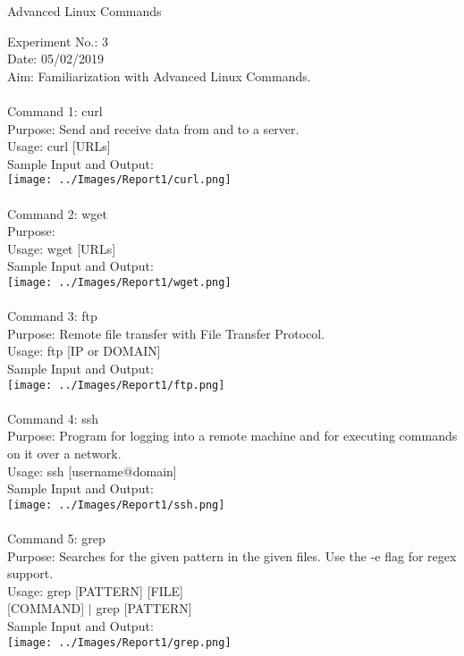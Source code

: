 \documentclass[10pt,a4paper]{report}
\begin{document}
\begin{center}
\begin{Large}
Advanced Linux Commands
\end{Large}
\end{center}
Experiment No.: 3\\
Date: 05/02/2019\\
Aim: Familiarization with Advanced Linux Commands.\\
\\
Command 1: curl\\
Purpose: Send and receive data from and to a server.\\
Usage: curl [URLs]\\
Sample Input and Output: \\
\texttt{[image: ../Images/Report1/curl.png]}\\
\\
Command 2: wget\\
Purpose: \\
Usage: wget [URLs]\\
Sample Input and Output: \\
\texttt{[image: ../Images/Report1/wget.png]}\\
\\
Command 3: ftp\\
Purpose: Remote file transfer with File Transfer Protocol.\\
Usage: ftp [IP or DOMAIN]\\
Sample Input and Output: \\
\texttt{[image: ../Images/Report1/ftp.png]}\\
\pagebreak
\\
Command 4: ssh\\
Purpose: Program for logging into a remote machine and for executing commands on it over a network.\\
Usage: ssh [username@domain]\\
Sample Input and Output: \\
\texttt{[image: ../Images/Report1/ssh.png]}\\
\\
Command 5: grep\\
Purpose: Searches for the given pattern in the given files. Use the -e flag for regex support.\\
Usage: grep [PATTERN] [FILE]\\
{[COMMAND]} $|$ grep [PATTERN]\\
Sample Input and Output: \\
\texttt{[image: ../Images/Report1/grep.png]}
\end{document}
